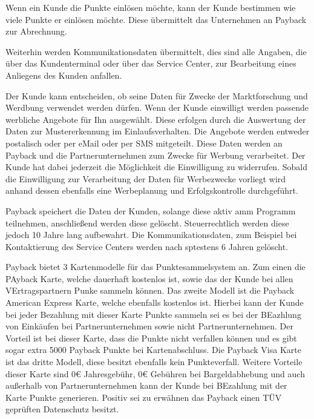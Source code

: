 \noindent Wenn ein Kunde die Punkte einlösen möchte, kann der Kunde bestimmen wie viele Punkte er einlösen möchte. Diese übermittelt das Unternehmen an Payback zur Abrechnung. \newline

\noindent Weiterhin werden Kommunikationsdaten übermittelt, dies sind alle Angaben, die über das Kundenterminal oder über das Service Center, zur Bearbeitung eines Anliegens des Kunden anfallen. \newline

\noindent Der Kunde kann entscheiden, ob seine Daten für Zwecke der Marktforschung und Werdbung verwendet werden dürfen. Wenn der Kunde einwilligt werden passende werbliche Angebote für Ihn ausgewählt. Diese erfolgen durch die Auswertung der Daten zur Mustererkennung im Einlaufsverhalten. Die Angebote werden entweder postalisch oder per eMail oder per SMS mitgeteilt. Diese Daten werden an Payback und die Partnerunternehmen zum Zwecke für Werbung verarbeitet. Der Kunde hat dabei jederzeit die Möglichkeit die Einwilligung zu widerrufen. Sobald die Einwilligung zur Verarbeitung der Daten für Werbezwecke vorliegt wird anhand dessen ebenfalls eine Werbeplanung und Erfolgskontrolle durchgeführt. \newline

\noindent Payback speichert die Daten der Kunden, solange diese aktiv amm Programm teilnehmen, anschließend werden diese gelöscht. Steuerrechtlich werden diese jedoch 10 Jahre lang aufbewahrt. Die Kommunikationsdaten, zum Beispiel bei Kontaktierung des Service Centers werden nach sptestens 6 Jahren gelöscht.
\cite{Payback_Datenschutz} \newline

\noindent Payback bietet 3 Kartenmodelle für das Punktesammelsystem an. Zum einen die PAyback Karte, welche dauerhaft kostenlos ist, sowie das der Kunde bei allen VErtragspartnern Punke sammeln können. Das zweite Modell ist die Payback American Express Karte, welche ebenfalls kostenlos ist. Hierbei kann der Kunde bei jeder Bezahlung mit dieser Karte Punkte sammeln sei es bei der BEazhlung von Einkäufen bei Partnerunternehmen sowie nicht Partnerunternehmen. Der Vorteil ist bei dieser Karte, dass die Punkte nicht verfallen können und es gibt sogar extra 5000 Payback Punkte bei Kartenabschluss. Die Payback Visa Karte ist das dritte Modell, diese besitzt ebenfalls kein Punkteverfall. Weitere Vorteile dieser Karte sind 0€ Jahresgebühr, 0€ Gebühren bei Bargeldabhebung und auch außerhalb von Partnerunternehmen kann der Kunde bei BEzahlung mit der Karte Punkte generieren. Positiv sei zu erwähnen das Payback einen TÜV geprüften Datenschutz besitzt. \cite{Payback_Karten}